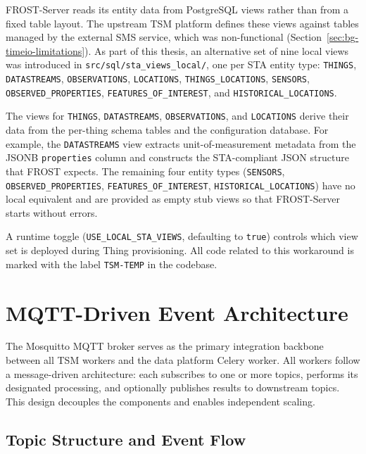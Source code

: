 FROST-Server reads its entity data from PostgreSQL views rather than from a fixed table layout.
The upstream TSM platform defines these views against tables managed by the external SMS
service, which was non-functional (Section~\ref{sec:bg-timeio-limitations}). As part of this
thesis, an alternative set of nine local views was introduced in
\texttt{src/sql/sta\_views\_local/}, one per STA entity type: \texttt{THINGS},
\texttt{DATASTREAMS}, \texttt{OBSERVATIONS}, \texttt{LOCATIONS}, \texttt{THINGS\_LOCATIONS},
\texttt{SENSORS}, \texttt{OBSERVED\_PROPERTIES}, \texttt{FEATURES\_OF\_INTEREST}, and
\texttt{HISTORICAL\_LOCATIONS}.

The views for \texttt{THINGS}, \texttt{DATASTREAMS}, \texttt{OBSERVATIONS}, and
\texttt{LOCATIONS} derive their data from the per-thing schema tables and the configuration
database. For example, the \texttt{DATASTREAMS} view extracts unit-of-measurement metadata
from the JSONB \texttt{properties} column and constructs the STA-compliant JSON structure
that FROST expects. The remaining four entity types (\texttt{SENSORS},
\texttt{OBSERVED\_PROPERTIES}, \texttt{FEATURES\_OF\_INTEREST},
\texttt{HISTORICAL\_LOCATIONS}) have no local equivalent and are provided as empty stub
views so that FROST-Server starts without errors.

A runtime toggle (\texttt{USE\_LOCAL\_STA\_VIEWS}, defaulting to \texttt{true}) controls
which view set is deployed during Thing provisioning. All code related to this workaround
is marked with the label \texttt{TSM-TEMP} in the codebase.

\section{MQTT-Driven Event Architecture}
\label{sec:arch-mqtt}

The Mosquitto MQTT broker serves as the primary integration backbone between all TSM workers
and the data platform Celery worker. All workers follow a message-driven architecture:
each subscribes to one or more topics, performs its designated processing, and optionally
publishes results to downstream topics. This design decouples the components and enables
independent scaling.

\subsection{Topic Structure and Event Flow}
\label{sec:arch-mqtt-topics}

